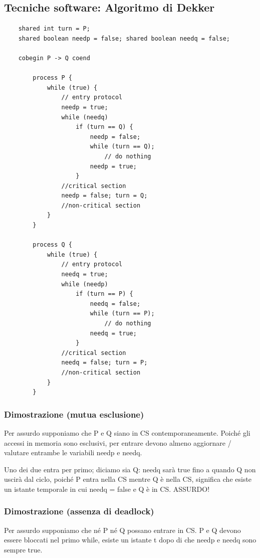 \subsection{Tecniche software: Algoritmo di Dekker}
\begin{lstlisting}
    shared int turn = P;
    shared boolean needp = false; shared boolean needq = false;
    
    cobegin P -> Q coend
        
        process P {
            while (true) {
                // entry protocol 
                needp = true;
                while (needq)
                    if (turn == Q) {
                        needp = false;
                        while (turn == Q);
                            // do nothing 
                        needp = true;
                    }
                //critical section
                needp = false; turn = Q;
                //non-critical section
            }
        }

        process Q {
            while (true) {
                // entry protocol 
                needq = true;
                while (needp)
                    if (turn == P) {
                        needq = false;
                        while (turn == P); 
                            // do nothing
                        needq = true;
                    }
                //critical section
                needq = false; turn = P;
                //non-critical section
            }
        }
\end{lstlisting}

\subsubsection{Dimostrazione (mutua esclusione)}

Per assurdo supponiamo che P e Q siano in CS contemporaneamente.
Poiché gli accessi in memoria sono esclusivi, per entrare devono almeno aggiornare / valutare entrambe le variabili needp e needq.

Uno dei due entra per primo; diciamo sia Q: needq sarà true fino a quando Q non uscirà dal ciclo, poiché P entra nella CS mentre Q è nella CS, significa che esiste un istante temporale in cui needq = false e Q è in CS.
\newline
ASSURDO!

\subsubsection{Dimostrazione (assenza di deadlock)}
Per assurdo supponiamo che né P né Q possano entrare in CS. P e Q devono essere bloccati nel primo while, esiste un istante t dopo di che needp e needq sono sempre true.

